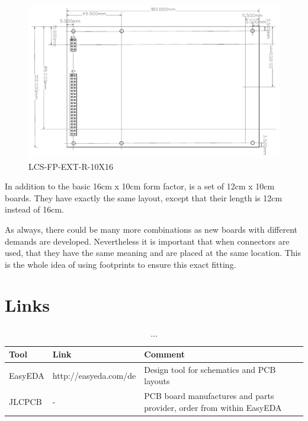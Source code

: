 \begin{figure}[htbp]
    \centering
    \includegraphics[page=1, scale=0.7]{./Figures/LCS-FP-EXT-L-10X16.pdf}
    \caption{LCS-FP-EXT-R-10X16}
\end{figure}

\FloatBarrier

In addition to the basic 16cm x 10cm form factor, is a set of 12cm x 10cm boards. They have exactly the same layout, except that their length is 12cm instead of 16cm. 

As always, there could be many more combinations as new boards with different demands are developed. Nevertheless it is important that when connectors are used, that they have the same meaning and are placed at the same location. This is the whole idea of using footprints to ensure this exact fitting.

\section{Links}

\begin{table}[!ht]
    \begin{center}
        \caption{...}
        \begin{tabular}{|l|l|p{}|}
            \toprule
            \textbf{Tool} & \textbf{Link} & \textbf{Comment} \\
            \midrule
            EasyEDA & http://easyeda.com/de & Design tool for schematics and PCB layouts \\
            \midrule
            JLCPCB & - & PCB board manufactures and parts provider, order from within EasyEDA \\
            \bottomrule
        \end{tabular}
    \end{center}
\end{table}
